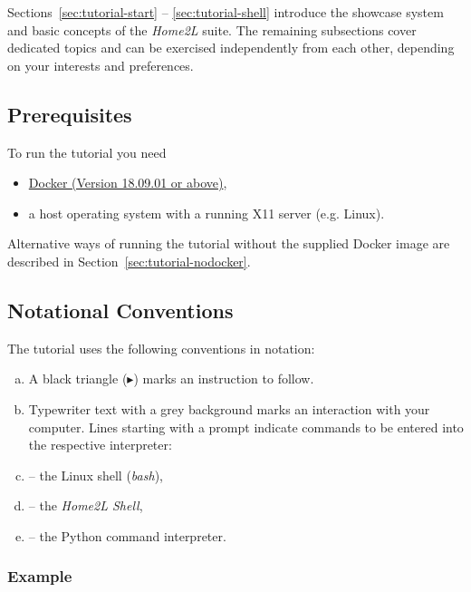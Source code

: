 \documentclass[12pt,english,parskip=half,headheight=19pt]{scrreprt}
\renewenvironment{description}[1][8ex]
  {\list{}{\labelwidth=5ex \leftmargin=#1 \let\makelabel\descriptionlabel}}
  {\endlist}
\newcommand{\lst}[1]{\colorbox{lstbackground}{\footnotesize\code{#1}}}
\newcommand{\lstf}[1]{\colorbox{lstbackground}{\ttfamily\footnotesize#1}}
\begin{document}
Sections~\ref{sec:tutorial-start} -- \ref{sec:tutorial-shell} introduce the showcase system and basic concepts of the \textit{Home2L} suite. The remaining subsections cover dedicated topics and can be exercised independently from each other, depending on your interests and preferences.



\subsection{Prerequisites}

To run the tutorial you need

\begin{itemize}
  \item \href{https://en.wikipedia.org/wiki/Docker_(software)}{Docker (Version 18.09.01 or above)},
  \item a host operating system with a running X11 server (e.g. Linux).
\end{itemize}

Alternative ways of running the tutorial without the supplied Docker image are described in Section~\ref{sec:tutorial-nodocker}.



\subsection{Notational Conventions}

The tutorial uses the following conventions in notation:

\begin{enumerate}[a)]
  \item A black triangle ($\blacktriangleright$) marks an instruction to follow.
  \item \lstf{Typewriter text with a grey background} marks an interaction with your computer.
    Lines starting with a prompt indicate commands to be entered into the respective
    interpreter:
    \begin{description}
      \item[\lstf{\$}] -- the Linux shell (\textit{bash}),
      \item[\lst{home2l>}] -- the \textit{Home2L Shell},
      \item[\lst{>>>}] -- the Python command interpreter.
    \end{description}
\end{enumerate}


\subsubsection*{Example}
\end{document}
